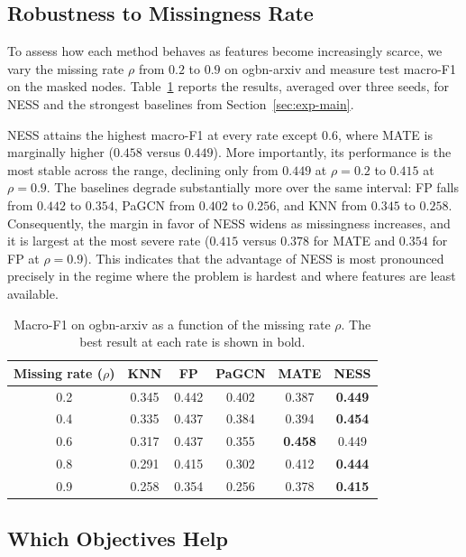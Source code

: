 \subsection{Robustness to Missingness Rate}
\label{sec:exp-rate}

To assess how each method behaves as features become increasingly scarce, we vary the missing rate $\rho$ from $0.2$ to $0.9$ on ogbn-arxiv and measure test macro-F1 on the masked nodes. Table~\ref{tab:rate} reports the results, averaged over three seeds, for NESS and the strongest baselines from Section~\ref{sec:exp-main}.

NESS attains the highest macro-F1 at every rate except $0.6$, where MATE is marginally higher ($0.458$ versus $0.449$). More importantly, its performance is the most stable across the range, declining only from $0.449$ at $\rho=0.2$ to $0.415$ at $\rho=0.9$. The baselines degrade substantially more over the same interval: FP falls from $0.442$ to $0.354$, PaGCN from $0.402$ to $0.256$, and KNN from $0.345$ to $0.258$. Consequently, the margin in favor of NESS widens as missingness increases, and it is largest at the most severe rate ($0.415$ versus $0.378$ for MATE and $0.354$ for FP at $\rho=0.9$). This indicates that the advantage of NESS is most pronounced precisely in the regime where the problem is hardest and where features are least available.

\begin{table}[t]
\centering
\caption{Macro-F1 on ogbn-arxiv as a function of the missing rate $\rho$. The best result at each rate is shown in bold.}
\label{tab:rate}
\small
\begin{tabular}{@{}cccccc@{}}
\toprule
\textbf{Missing rate ($\rho$)} & \textbf{KNN} & \textbf{FP} & \textbf{PaGCN} & \textbf{MATE} & \textbf{NESS} \\
\midrule
0.2 & 0.345 & 0.442 & 0.402 & 0.387 & \textbf{0.449} \\
0.4 & 0.335 & 0.437 & 0.384 & 0.394 & \textbf{0.454} \\
0.6 & 0.317 & 0.437 & 0.355 & \textbf{0.458} & 0.449 \\
0.8 & 0.291 & 0.415 & 0.302 & 0.412 & \textbf{0.444} \\
0.9 & 0.258 & 0.354 & 0.256 & 0.378 & \textbf{0.415} \\
\bottomrule
\end{tabular}
\end{table}




\subsection{Which Objectives Help}
\label{sec:exp-objectives}


